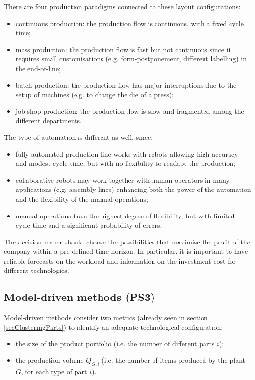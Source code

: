 There are four production paradigms connected to these layout configurations:

\begin{itemize}
    \item continuous production: the production flow is continuous, with a fixed cycle time;
    \item mass production: the production flow is fast but not continuous since it requires small customisations (e.g. form-postponement, different labelling) in the end-of-line;
    \item batch production: the production flow has major interruptions due to the setup of machines (e.g. to change the die of a press);
    \item job-shop production: the production flow is slow and fragmented among the different departments.

\end{itemize}

The type of automation is different as well, since:

\begin{itemize}
    \item fully automated production line works with robots allowing high accuracy and modest cycle time, but with no flexibility to readapt the production;
    \item collaborative robots may work together with human operators in many applications (e.g. assembly lines) enhancing both the power of the automation and the flexibility of the manual operations;
    \item manual operations have the highest degree of flexibility, but with limited cycle time and a significant probability of errors.

\end{itemize}

The decision-maker should choose the possibilities that maximise the profit of the company within a pre-defined time horizon. In particular, it is important to have reliable forecasts on the workload and information on the investment cost for different technologies.

\subsection{Model-driven methods (PS3)}
Model-driven methods consider two metrics (already seen in section \ref{secClusteringParts}) to identify an adequate technological configuration:

\begin{itemize}
    \item the size of the product portfolio (i.e. the number of different parts $i$);
	\item the production volume $Q_{G,i}$ (i.e. the number of items produced by the plant $G$, for each type of part $i$).

\end{itemize}

